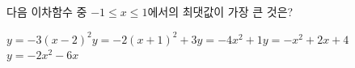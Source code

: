 다음 이차함수 중 $-1\le x\le 1$에서의 최댓값이 가장 큰 것은?
\begin{choicesii}{$y=-3(x-2)^2$}{$y=-2(x+1)^2+3$}{$y=-4x^2+1$}{$y=-x^2+2x+4$}{$y=-2x^2-6x$}\end{choicesii}
